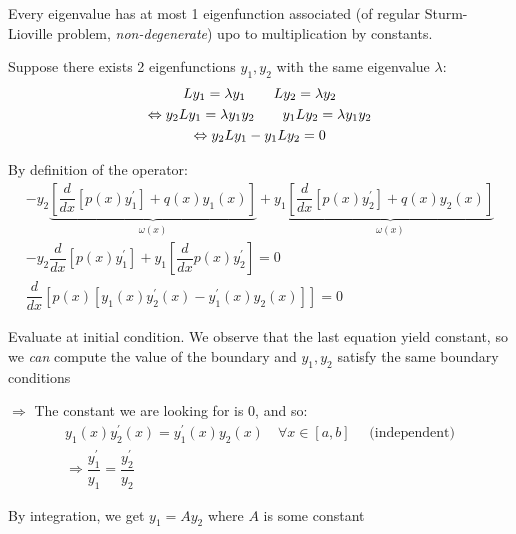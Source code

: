 \par\bigskip
\begin{theo}[]{}
  Every eigenvalue has at most 1 eigenfunction associated (of regular Sturm-Lioville problem, \textit{non-degenerate}) upo to multiplication by constants.
\end{theo}
\par\bigskip
\begin{prf}[]{}
  Suppose there exists 2 eigenfunctions $y_1,y_2$ with the same eigenvalue $\lambda$:
  \begin{equation*}
    \begin{gathered}
      Ly_1 = \lambda y_1\qquad Ly_2 = \lambda y_2\\
      \Leftrightarrow y_2Ly_1 = \lambda y_1y_2\qquad y_1Ly_2 = \lambda y_1y_2\\
      \Leftrightarrow y_2Ly_1-y_1Ly_2 = 0
    \end{gathered}
  \end{equation*}\par
  \noindent By definition of the operator:
  \begin{equation*}
    \begin{gathered}
      -y_2\underbrace{\left[\dfrac{d}{dx}\left[p(x)y_1^{\prime}\right]+q(x)y_1(x)\right]}_{\text{$\omega(x)$}}+y_1\underbrace{\left[\dfrac{d}{dx}\left[p(x)y_2^{\prime}\right]+q(x)y_2(x)\right]}_{\text{$\omega(x)$}}\\
      -y_2\dfrac{d}{dx}\left[p(x)y_1^{\prime}\right]+y_1\left[\dfrac{d}{dx}p(x)y_2^{\prime}\right] = 0\\
      \dfrac{d}{dx}\left[p(x)\left[y_1(x)y_2^{\prime}(x)-y_1^{\prime}(x)y_2(x)\right]\right]=0
    \end{gathered}
  \end{equation*}\par
  \noindent Evaluate at initial condition. We observe that the last equation yield constant, so we \textit{can} compute the value of the boundary and $y_1,y_2$ satisfy the same boundary conditions\par
  \noindent $\Rightarrow$ The constant we are looking for is 0, and so:
  \begin{equation*}
    \begin{gathered}
      y_1(x)y_2^{\prime}(x) = y_1^{\prime}(x)y_2(x)\quad\forall x\in[a,b]\quad \text{ (independent)}\\
      \Rightarrow \dfrac{y_1^{\prime}}{y_1} = \dfrac{y_2^{\prime}}{y_2}
    \end{gathered}
  \end{equation*}\par
  \noindent By integration, we get $y_1 = Ay_2$ where $A$ is some constant
\end{prf}
